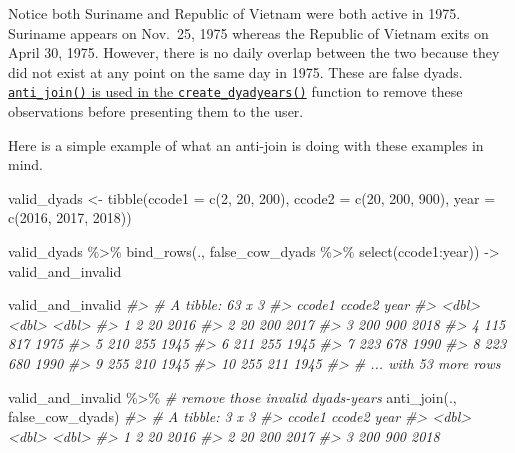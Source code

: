 \documentclass[
  11pt,
]{article}
\newenvironment{Shaded}{\begin{snugshade}}{\end{snugshade}}
\newcommand{\AttributeTok}[1]{\textcolor[rgb]{0.77,0.63,0.00}{#1}}
\newcommand{\CommentTok}[1]{\textcolor[rgb]{0.56,0.35,0.01}{\textit{#1}}}
\newcommand{\DecValTok}[1]{\textcolor[rgb]{0.00,0.00,0.81}{#1}}
\newcommand{\FunctionTok}[1]{\textcolor[rgb]{0.00,0.00,0.00}{#1}}
\newcommand{\NormalTok}[1]{#1}
\newcommand{\OtherTok}[1]{\textcolor[rgb]{0.56,0.35,0.01}{#1}}
\newcommand{\SpecialCharTok}[1]{\textcolor[rgb]{0.00,0.00,0.00}{#1}}
\begin{document}
Notice both Suriname and Republic of Vietnam were both active in 1975. Suriname appears on Nov.~25, 1975 whereas the Republic of Vietnam exits on April 30, 1975. However, there is no daily overlap between the two because they did not exist at any point on the same day in 1975. These are false dyads. \href{https://github.com/svmiller/peacesciencer/blob/master/R/create_dyadyears.R}{\texttt{anti\_join()} is used in the \texttt{create\_dyadyears()}} function to remove these observations before presenting them to the user.

Here is a simple example of what an anti-join is doing with these examples in mind.

\begin{Shaded}
\begin{Highlighting}[]
\NormalTok{valid\_dyads }\OtherTok{\textless{}{-}} \FunctionTok{tibble}\NormalTok{(}\AttributeTok{ccode1 =} \FunctionTok{c}\NormalTok{(}\DecValTok{2}\NormalTok{, }\DecValTok{20}\NormalTok{, }\DecValTok{200}\NormalTok{),}
                      \AttributeTok{ccode2 =} \FunctionTok{c}\NormalTok{(}\DecValTok{20}\NormalTok{, }\DecValTok{200}\NormalTok{, }\DecValTok{900}\NormalTok{),}
                      \AttributeTok{year =} \FunctionTok{c}\NormalTok{(}\DecValTok{2016}\NormalTok{, }\DecValTok{2017}\NormalTok{, }\DecValTok{2018}\NormalTok{))}

\NormalTok{valid\_dyads }\SpecialCharTok{\%\textgreater{}\%}
  \FunctionTok{bind\_rows}\NormalTok{(., false\_cow\_dyads }\SpecialCharTok{\%\textgreater{}\%} \FunctionTok{select}\NormalTok{(ccode1}\SpecialCharTok{:}\NormalTok{year)) }\OtherTok{{-}\textgreater{}}\NormalTok{ valid\_and\_invalid}

\NormalTok{valid\_and\_invalid }
\CommentTok{\#\textgreater{} \# A tibble: 63 x 3}
\CommentTok{\#\textgreater{}    ccode1 ccode2  year}
\CommentTok{\#\textgreater{}     \textless{}dbl\textgreater{}  \textless{}dbl\textgreater{} \textless{}dbl\textgreater{}}
\CommentTok{\#\textgreater{}  1      2     20  2016}
\CommentTok{\#\textgreater{}  2     20    200  2017}
\CommentTok{\#\textgreater{}  3    200    900  2018}
\CommentTok{\#\textgreater{}  4    115    817  1975}
\CommentTok{\#\textgreater{}  5    210    255  1945}
\CommentTok{\#\textgreater{}  6    211    255  1945}
\CommentTok{\#\textgreater{}  7    223    678  1990}
\CommentTok{\#\textgreater{}  8    223    680  1990}
\CommentTok{\#\textgreater{}  9    255    210  1945}
\CommentTok{\#\textgreater{} 10    255    211  1945}
\CommentTok{\#\textgreater{} \# ... with 53 more rows}

\NormalTok{valid\_and\_invalid }\SpecialCharTok{\%\textgreater{}\%}
  \CommentTok{\# remove those invalid dyads{-}years}
  \FunctionTok{anti\_join}\NormalTok{(., false\_cow\_dyads)}
\CommentTok{\#\textgreater{} \# A tibble: 3 x 3}
\CommentTok{\#\textgreater{}   ccode1 ccode2  year}
\CommentTok{\#\textgreater{}    \textless{}dbl\textgreater{}  \textless{}dbl\textgreater{} \textless{}dbl\textgreater{}}
\CommentTok{\#\textgreater{} 1      2     20  2016}
\CommentTok{\#\textgreater{} 2     20    200  2017}
\CommentTok{\#\textgreater{} 3    200    900  2018}
\end{Highlighting}
\end{Shaded}
\end{document}
